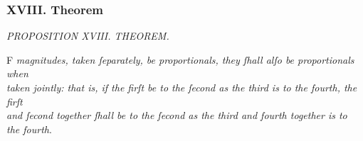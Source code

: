 \documentclass[12pt,preview]{standalone}
\begin{document}
\subsubsection{XVIII. Theorem}

\begin{minipage}{\textwidth}

    \begin{center}
        \textit{PROPOSITION XVIII. THEOREM.}\label{book5pr18} \\
    \end{center}

    \hfill

    \begin{center}
        \raggedright \lettrine[lines=4, loversize=1, nindent=0pt]{}{}F \textit{magnitudes, taken ſeparately, be proportionals, they ſhall alſo be proportionals when\\ taken jointly: that is, if the firſt be to the ſecond as the third is to the fourth, the firſt\\ and ſecond together ſhall be to the ſecond as the third and fourth together is to\\ the fourth}.
    \end{center}

    \hfill

    \hfill


\end{minipage}
\end{document}
